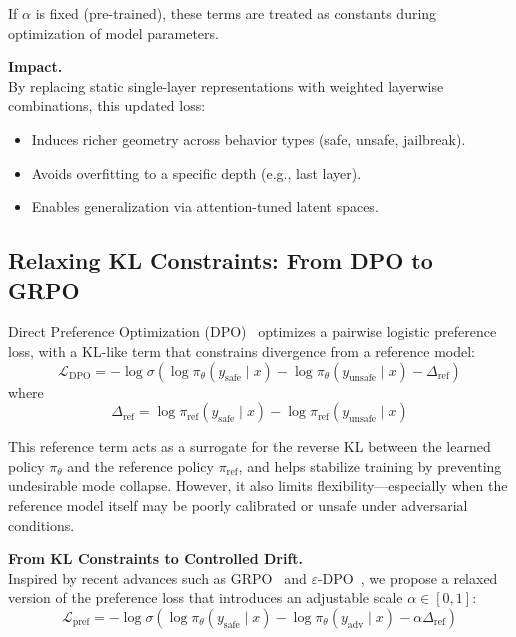 \noindent If $\alpha$ is fixed (pre-trained), these terms are treated as constants during optimization of model parameters.

\vspace{1mm}
\noindent\textbf{Impact.} \\
By replacing static single-layer representations with weighted layerwise combinations, this updated loss:
\begin{itemize}[leftmargin=1.5em]
    \item Induces richer geometry across behavior types (safe, unsafe, jailbreak).
    \item Avoids overfitting to a specific depth (e.g., last layer).
    \item Enables generalization via attention-tuned latent spaces.
\end{itemize}

\subsection{Relaxing KL Constraints: From DPO to GRPO}

Direct Preference Optimization (DPO)~\cite{rafailov2023direct} optimizes a pairwise logistic preference loss, with a KL-like term that constrains divergence from a reference model:
\[
\mathcal{L}_{\mathrm{DPO}} = -\log \sigma\left(
\log \pi_\theta(y_{\mathrm{safe}} \mid x) -
\log \pi_\theta(y_{\mathrm{unsafe}} \mid x) -
\Delta_{\mathrm{ref}}
\right)
\]
where
\[
\Delta_{\mathrm{ref}} =
\log \pi_{\mathrm{ref}}(y_{\mathrm{safe}} \mid x) -
\log \pi_{\mathrm{ref}}(y_{\mathrm{unsafe}} \mid x)
\]

This reference term acts as a surrogate for the reverse KL between the learned policy $\pi_\theta$ and the reference policy $\pi_{\mathrm{ref}}$, and helps stabilize training by preventing undesirable mode collapse. However, it also limits flexibility—especially when the reference model itself may be poorly calibrated or unsafe under adversarial conditions.

\vspace{1mm}
\textbf{From KL Constraints to Controlled Drift.} \\
Inspired by recent advances such as GRPO~\cite{wu2024generalized} and $\varepsilon$-DPO~\cite{chen2023epsilon}, we propose a relaxed version of the preference loss that introduces an adjustable scale $\alpha \in [0,1]$:
\[
\mathcal{L}_{\mathrm{pref}} = -\log \sigma\left(
\log \pi_\theta(y_{\mathrm{safe}} \mid x) -
\log \pi_\theta(y_{\mathrm{adv}} \mid x) -
\alpha \Delta_{\mathrm{ref}}
\right)
\]

